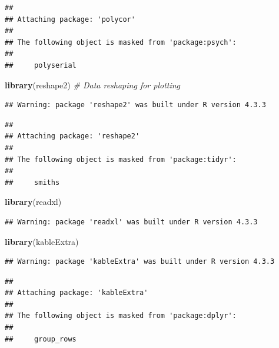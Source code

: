 \documentclass[
]{article}
\newenvironment{Shaded}{\begin{snugshade}}{\end{snugshade}}
\newcommand{\CommentTok}[1]{\textcolor[rgb]{0.56,0.35,0.01}{\textit{#1}}}
\newcommand{\FunctionTok}[1]{\textcolor[rgb]{0.13,0.29,0.53}{\textbf{#1}}}
\newcommand{\NormalTok}[1]{#1}
\begin{document}
\begin{verbatim}
## 
## Attaching package: 'polycor'
## 
## The following object is masked from 'package:psych':
## 
##     polyserial
\end{verbatim}

\begin{Shaded}
\begin{Highlighting}[]
\FunctionTok{library}\NormalTok{(reshape2)     }\CommentTok{\# Data reshaping for plotting}
\end{Highlighting}
\end{Shaded}

\begin{verbatim}
## Warning: package 'reshape2' was built under R version 4.3.3
\end{verbatim}

\begin{verbatim}
## 
## Attaching package: 'reshape2'
## 
## The following object is masked from 'package:tidyr':
## 
##     smiths
\end{verbatim}

\begin{Shaded}
\begin{Highlighting}[]
\FunctionTok{library}\NormalTok{(readxl)}
\end{Highlighting}
\end{Shaded}

\begin{verbatim}
## Warning: package 'readxl' was built under R version 4.3.3
\end{verbatim}

\begin{Shaded}
\begin{Highlighting}[]
\FunctionTok{library}\NormalTok{(kableExtra)}
\end{Highlighting}
\end{Shaded}

\begin{verbatim}
## Warning: package 'kableExtra' was built under R version 4.3.3
\end{verbatim}

\begin{verbatim}
## 
## Attaching package: 'kableExtra'
## 
## The following object is masked from 'package:dplyr':
## 
##     group_rows
\end{verbatim}
\end{document}
